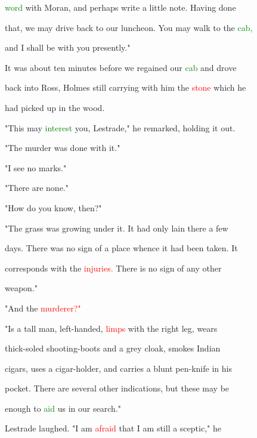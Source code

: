  \textcolor{green}{word} with Moran, and perhaps write a little note. Having done

 that, we may drive back to our luncheon. You may walk to the \textcolor{green}{cab,}

 and I shall be with you presently."



 It was about ten minutes before we regained our \textcolor{green}{cab} and drove

 back into Ross, Holmes still carrying with him the \textcolor{red}{stone} which he

 had picked up in the wood.



 "This may \textcolor{green}{interest} you, Lestrade," he remarked, holding it out.

 "The \textcolor{BurntOrange}{murder} was done with it."



 "I see no marks."



 "There are none."



 "How do you know, then?"



 "The grass was \textcolor{BurntOrange}{growing} under it. It had only lain there a few

 days. There was no sign of a place whence it had been taken. It

 corresponds with the \textcolor{red}{injuries.} There is no sign of any other

 weapon."



 "And the \textcolor{red}{murderer?"}



 "Is a tall man, left-handed, \textcolor{red}{limps} with the right leg, \textcolor{BurntOrange}{wears}

 thick-soled shooting-boots and a grey cloak, smokes Indian

 cigars, uses a cigar-holder, and carries a blunt pen-knife in his

 pocket. There are several other indications, but these may be

 enough to \textcolor{green}{aid} us in our search."



 Lestrade \textcolor{BurntOrange}{laughed.} "I am \textcolor{red}{afraid} that I am still a sceptic," he

